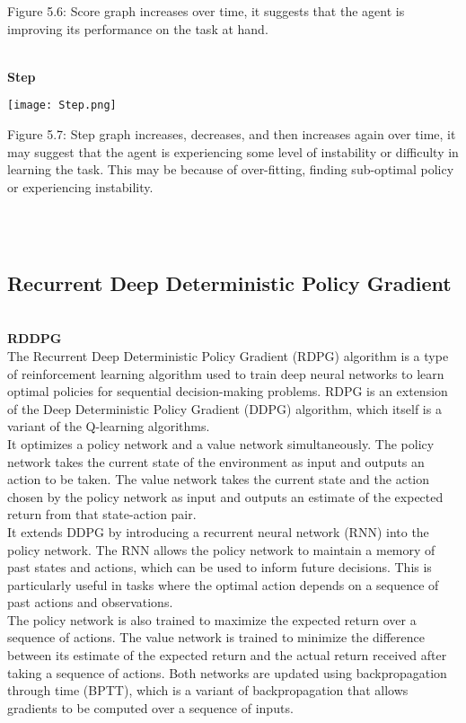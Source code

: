 \documentclass[conference]{IEEEtran}
\begin{document}
\caption{Figure 5.6: Score graph increases over time, it suggests that the agent is improving its performance on the task at hand.
}\\

\textbf{Step}\\

\graphicspath{ {./images/} }
\texttt{[image: Step.png]}
\caption{Figure 5.7: Step graph increases, decreases, and then increases again over time, it may suggest that the agent is experiencing some level of instability or difficulty in learning the task. This may be because of over-fitting, finding sub-optimal policy or experiencing instability.}\\
 
\\

\subsection{Recurrent Deep Deterministic Policy Gradient}\\

\textbf{RDDPG}\\

The Recurrent Deep Deterministic Policy Gradient (RDPG) algorithm is a type of reinforcement learning algorithm used to train deep neural networks to learn optimal policies for sequential decision-making problems. RDPG is an extension of the Deep Deterministic Policy Gradient (DDPG) algorithm, which itself is a variant of the Q-learning algorithms.\\
It optimizes a policy network and a value network simultaneously. The policy network takes the current state of the environment as input and outputs an action to be taken. The value network takes the current state and the action chosen by the policy network as input and outputs an estimate of the expected return from that state-action pair.\\
It extends DDPG by introducing a recurrent neural network (RNN) into the policy network. The RNN allows the policy network to maintain a memory of past states and actions, which can be used to inform future decisions. This is particularly useful in tasks where the optimal action depends on a sequence of past actions and observations.\\
The policy network is also trained to maximize the expected return over a sequence of actions. The value network is trained to minimize the difference between its estimate of the expected return and the actual return received after taking a sequence of actions. Both networks are updated using backpropagation through time (BPTT), which is a variant of backpropagation that allows gradients to be computed over a sequence of inputs.\\
\end{document}
